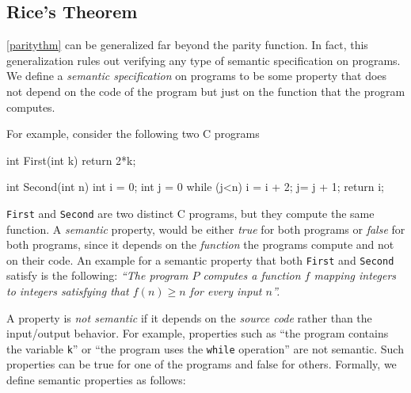 
\subsection{Rice's Theorem}\label{ricethmsec}

\cref{paritythm} can be generalized far beyond the parity function. In
fact, this generalization rules out verifying any type of semantic
specification on programs. We define a \emph{semantic specification} on
programs to be some property that does not depend on the code of the
program but just on the function that the program computes.

For example, consider the following two C programs

\begin{code}
int First(int k) {
    return 2*k;
}
\end{code}

\begin{code}
int Second(int n) {
    int i = 0;
    int j = 0
    while (j<n) {
        i = i + 2;
        j=  j + 1;
    }
    return i;
}
\end{code}

\texttt{First} and \texttt{Second} are two distinct C programs, but they
compute the same function. A \emph{semantic} property, would be either
\emph{true} for both programs or \emph{false} for both programs, since
it depends on the \emph{function} the programs compute and not on their
code. An example for a semantic property that both \texttt{First} and
\texttt{Second} satisfy is the following: \emph{``The program \(P\)
computes a function \(f\) mapping integers to integers satisfying that
\(f(n) \geq n\) for every input \(n\)''.}

A property is \emph{not semantic} if it depends on the \emph{source
code} rather than the input/output behavior. For example, properties
such as ``the program contains the variable \texttt{k}'' or ``the
program uses the \texttt{while} operation'' are not semantic. Such
properties can be true for one of the programs and false for others.
Formally, we define semantic properties as follows:

